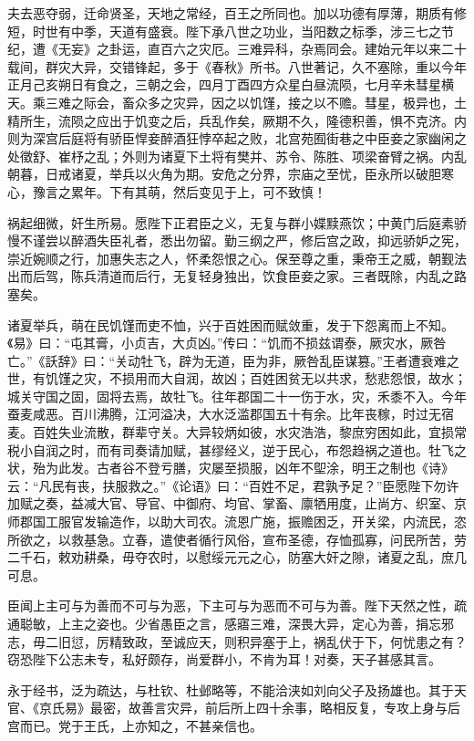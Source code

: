 \documentclass[]{article}
\begin{document}
夫去恶夺弱，迁命贤圣，天地之常经，百王之所同也。加以功德有厚薄，期质有修短，时世有中季，天道有盛衰。陛下承八世之功业，当阳数之标季，涉三七之节纪，遭《无妄》之卦运，直百六之灾厄。三难异科，杂焉同会。建始元年以来二十载间，群灾大异，交错锋起，多于《春秋》所书。八世著记，久不塞除，重以今年正月己亥朔日有食之，三朝之会，四月丁酉四方众星白昼流陨，七月辛未彗星横天。乘三难之际会，畜众多之灾异，因之以饥馑，接之以不赡。彗星，极异也，土精所生，流陨之应出于饥变之后，兵乱作矣，厥期不久，隆德积善，惧不克济。内则为深宫后庭将有骄臣悍妾醉酒狂悖卒起之败，北宫苑囿街巷之中臣妾之家幽闲之处徵舒、崔杼之乱；外则为诸夏下土将有樊并、苏令、陈胜、项梁奋臂之祸。内乱朝暮，日戒诸夏，举兵以火角为期。安危之分界，宗庙之至忧，臣永所以破胆寒心，豫言之累年。下有其萌，然后变见于上，可不致慎！

祸起细微，奸生所易。愿陛下正君臣之义，无复与群小媟黩燕饮；中黄门后庭素骄慢不谨尝以醉酒失臣礼者，悉出勿留。勤三纲之严，修后宫之政，抑远骄妒之宪，崇近婉顺之行，加惠失志之人，怀柔怨恨之心。保至尊之重，秉帝王之威，朝觐法出而后驾，陈兵清道而后行，无复轻身独出，饮食臣妾之家。三者既除，内乱之路塞矣。

诸夏举兵，萌在民饥馑而吏不恤，兴于百姓困而赋敛重，发于下怨离而上不知。《易》曰：``屯其膏，小贞吉，大贞凶。''传曰：``饥而不损兹谓泰，厥灾水，厥咎亡。''《訞辞》曰：``关动牡飞，辟为无道，臣为非，厥咎乱臣谋篡。''王者遭衰难之世，有饥馑之灾，不损用而大自润，故凶；百姓困贫无以共求，愁悲怨恨，故水；城关守国之固，固将去焉，故牡飞。往年郡国二十一伤于水，灾，禾黍不入。今年蚕麦咸恶。百川沸腾，江河溢决，大水泛滥郡国五十有余。比年丧稼，时过无宿麦。百姓失业流散，群辈守关。大异较炳如彼，水灾浩浩，黎庶穷困如此，宜损常税小自润之时，而有司奏请加赋，甚缪经义，逆于民心，布怨趋祸之道也。牡飞之状，殆为此发。古者谷不登亏膳，灾屡至损服，凶年不堲涂，明王之制也《诗》云：``凡民有丧，扶服救之。''《论语》曰：``百姓不足，君孰予足？''臣愿陛下勿许加赋之奏，益减大官、导官、中御府、均官、掌畜、廪牺用度，止尚方、织室、京师郡国工服官发输造作，以助大司农。流恩广施，振赡困乏，开关梁，内流民，恣所欲之，以救基急。立春，遣使者循行风俗，宣布圣德，存恤孤寡，问民所苦，劳二千石，敕劝耕桑，毋夺农时，以慰绥元元之心，防塞大奸之隙，诸夏之乱，庶几可息。

臣闻上主可与为善而不可与为恶，下主可与为恶而不可与为善。陛下天然之性，疏通聪敏，上主之姿也。少省愚臣之言，感寤三难，深畏大异，定心为善，捐忘邪志，毋二旧愆，厉精致政，至诚应天，则积异塞于上，祸乱伏于下，何忧患之有？窃恐陛下公志未专，私好颇存，尚爱群小，不肯为耳！对奏，天子甚感其言。

永于经书，泛为疏达，与杜钦、杜邺略等，不能洽浃如刘向父子及扬雄也。其于天官、《京氏易》最密，故善言灾异，前后所上四十余事，略相反复，专攻上身与后宫而已。党于王氏，上亦知之，不甚亲信也。
\end{document}
